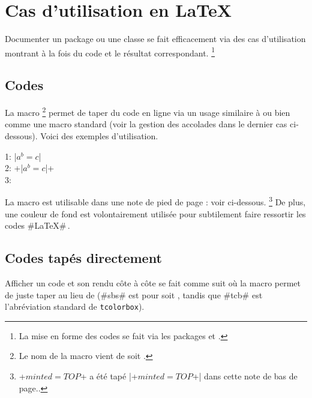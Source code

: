 \documentclass{tutodoc}
\begin{document}
\section{Cas d'utilisation en \LaTeX}
\label{tutodoc-listing-latex}

Documenter un package ou une classe se fait efficacement via des cas d'utilisation montrant à la fois du code et le résultat correspondant.%
\footnote{
    La mise en forme des codes se fait via les packages  et  .
}



\subsection{Codes }
\label{tutodoc-listing-latex-inline}

La macro 
\footnote{
    Le nom de la macro  vient de  soit .
}
permet de taper du code en ligne via un usage similaire à  ou bien comme une macro standard (voir la gestion des accolades dans le dernier cas ci-dessous).
Voici des exemples d'utilisation.


\begin{tdoclatex}
    1: \tdoclatexin|$a^b = c$|               \\
    2: \tdoclatexin+\tdoclatexin|$a^b = c$|+ \\
    3: 
\end{tdoclatex}


\begin{tdocnote}
    La macro  est utilisable dans une note de pied de page : voir ci-dessous.
    \footnote{
        \tdoclatexin+$minted = TOP$+ a été tapé \tdoclatexin|\tdoclatexin+$minted = TOP$+| dans cette note de bas de page..
    }
    De plus, une couleur de fond est volontairement utilisée pour subtilement faire ressortir les codes \tdoclatexin#\LaTeX#\,.
\end{tdocnote}



\subsection{Codes tapés directement}

\begin{tdocexa}
    Afficher un code et son rendu côte à côte se fait comme suit où la macro  permet de juste taper  au lieu de  (\tdoclatexin#sbs# est pour  soit , tandis que \tdoclatexin#tcb# est l'abréviation standard de \texttt{tcolorbox}).

\end{tdocexa}
\end{document}
